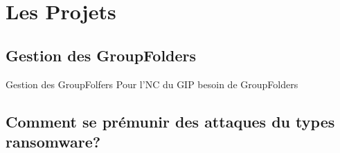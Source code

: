 \documentclass[aspectratio=169]{beamer}
\begin{document}
\section{Les Projets}
\subsection{Gestion des GroupFolders}
\begin{frame}{Gestion des GroupFolfers}
Pour l'NC du GIP besoin de GroupFolders 
\end{frame}
\subsection{Comment se prémunir des attaques du types ransomware?}
\begin{frame}

\end{frame}
\end{document}
